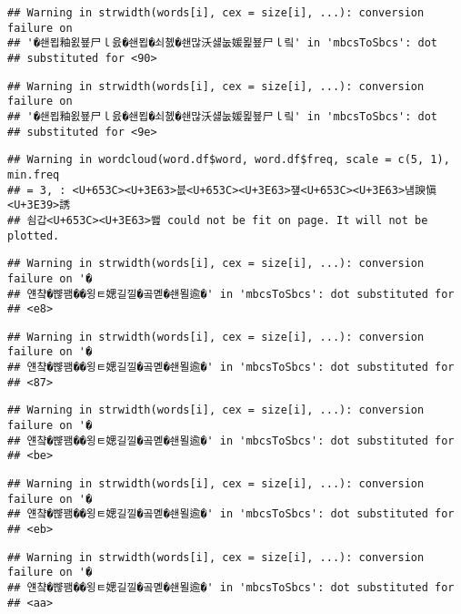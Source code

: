 \documentclass[]{article}
\begin{document}
\begin{verbatim}
## Warning in strwidth(words[i], cex = size[i], ...): conversion failure on
## '�쇈묍釉욄뵾尸ｌ읈�쇈묍�쇠쳸�쇈많沃섏눖媛묉뵾尸ｌ맄' in 'mbcsToSbcs': dot
## substituted for <90>
\end{verbatim}

\begin{verbatim}
## Warning in strwidth(words[i], cex = size[i], ...): conversion failure on
## '�쇈묍釉욄뵾尸ｌ읈�쇈묍�쇠쳸�쇈많沃섏눖媛묉뵾尸ｌ맄' in 'mbcsToSbcs': dot
## substituted for <9e>
\end{verbatim}

\begin{verbatim}
## Warning in wordcloud(word.df$word, word.df$freq, scale = c(5, 1), min.freq
## = 3, : <U+653C><U+3E63>븞<U+653C><U+3E63>쟾<U+653C><U+3E63>냼諛愼<U+3E39>誘
## 쇰갑<U+653C><U+3E63>쐞 could not be fit on page. It will not be plotted.
\end{verbatim}

\begin{verbatim}
## Warning in strwidth(words[i], cex = size[i], ...): conversion failure on '�
## 얜챸�뺞꽴��욍ㅌ媤길낄�곸몓�쇈묄逾�' in 'mbcsToSbcs': dot substituted for
## <e8>
\end{verbatim}

\begin{verbatim}
## Warning in strwidth(words[i], cex = size[i], ...): conversion failure on '�
## 얜챸�뺞꽴��욍ㅌ媤길낄�곸몓�쇈묄逾�' in 'mbcsToSbcs': dot substituted for
## <87>
\end{verbatim}

\begin{verbatim}
## Warning in strwidth(words[i], cex = size[i], ...): conversion failure on '�
## 얜챸�뺞꽴��욍ㅌ媤길낄�곸몓�쇈묄逾�' in 'mbcsToSbcs': dot substituted for
## <be>
\end{verbatim}

\begin{verbatim}
## Warning in strwidth(words[i], cex = size[i], ...): conversion failure on '�
## 얜챸�뺞꽴��욍ㅌ媤길낄�곸몓�쇈묄逾�' in 'mbcsToSbcs': dot substituted for
## <eb>
\end{verbatim}

\begin{verbatim}
## Warning in strwidth(words[i], cex = size[i], ...): conversion failure on '�
## 얜챸�뺞꽴��욍ㅌ媤길낄�곸몓�쇈묄逾�' in 'mbcsToSbcs': dot substituted for
## <aa>
\end{verbatim}
\end{document}
